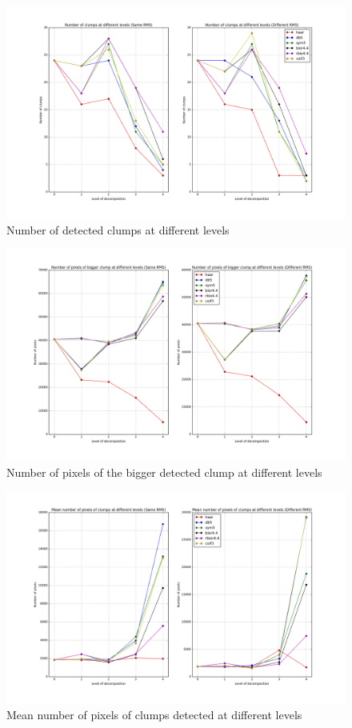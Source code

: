 \documentclass[letter, 11pt]{article}
\begin{document}
\begin{description}
    \begin{figure}[htpb!]
    \centering
    \includegraphics[width=17cm]{numclumpsgraph}
    \caption{Number of detected clumps at different levels}
    \label{fig:numclumps}
    \end{figure}
    \begin{figure}[htpb!]
    \centering
    \includegraphics[width=17cm]{numpixgraph}
    \caption{Number of pixels of the bigger detected clump at different levels}
    \label{fig:maxpix}
    \end{figure}
    \begin{figure}[htpb!]
    \centering
    \includegraphics[width=17cm]{meanpixgraph}
    \caption{Mean number of pixels of clumps detected at different levels}
    \label{fig:meanpix}
    \end{figure}


\end{description}
\end{document}
